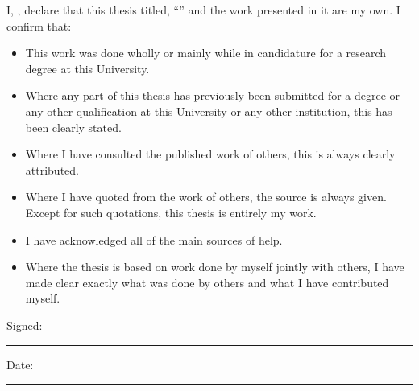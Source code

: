 \begin{declaration}
    \addchaptertocentry{\authorshipname} 
    
    \noindent I, \authorname, declare that this thesis titled, \enquote{\ttitle} and the work presented in it are my own. I confirm that:
    
    \begin{itemize} 
        \item This work was done wholly or mainly while in candidature for a research degree at this University.
        \item Where any part of this thesis has previously been submitted for a degree or any other qualification at this University or any other institution, this has been clearly stated.
        \item Where I have consulted the published work of others, this is always clearly attributed.
        \item Where I have quoted from the work of others, the source is always given. Except for such quotations, this thesis is entirely my work.
        \item I have acknowledged all of the main sources of help.
        \item Where the thesis is based on work done by myself jointly with others, I have made clear exactly what was done by others and what I have contributed myself.\\
    \end{itemize}
     
    \noindent Signed:\\
    \rule[0.5em]{25em}{0.5pt} 
    
    \noindent Date:\\
    \rule[0.5em]{25em}{0.5pt} 
\end{declaration}
